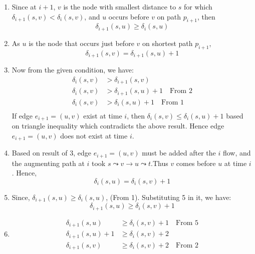 \documentclass[11pt]{article}
\begin{document}
\begin{enumerate}
    \item Since at $i+1$, $v$ is the node with smallest distance to $s$ for which $\delta_{i+1}(s,v) < \delta_{i}(s,v)$, and $u$ occurs before $v$ on path $p_{i+1}$, then
    $$\delta_{i+1}(s,u) \geq \delta_i(s,u)$$
    
    \item As $u$ is the node that occurs just before $v$ on shortest path $p_{i+1}$,
    $$\delta_{i+1}(s,v) = \delta_{i+1}(s,u) + 1$$
    
    \item Now from the given condition, we have:
        \begin{equation}\label{Q3_1}
            \begin{split}
                \delta_{i}(s,v) &> \delta_{i+1}(s,v)\\
                \delta_{i}(s,v) &> \delta_{i+1}(s,u)+1 \quad \text{From 2}\\
                \delta_{i}(s,v) &> \delta_{i}(s,u)+1 \quad \text{From 1}\\
            \end{split}
        \end{equation}
        If edge $e_{i+1}=(u, v)$ exist at time $i$, then $\delta_{i}(s,v) \leq \delta_{i}(s,u)+1$ based on triangle inequality which contradicts the above result. Hence edge $e_{i+1}=(u, v)$ does not exist at time $i$. 
        
    \item Based on result of $3$, edge $e_{i+1}=(u, v)$ must be added after the $i$ flow, and the augmenting path at $i$ took $s\leadsto v \rightarrow u \leadsto t$.Thus $v$ comes before $u$ at time $i$. Hence,
        $$\delta_{i}(s,u) = \delta_{i}(s,v)+1$$
        
    \item Since, $\delta_{i+1}(s,u) \geq \delta_i(s,u)$, (From 1). Substituting 5 in it, we have:
    $$\delta_{i+1}(s,u) \geq \delta_{i}(s,v)+1$$
    
    \item 
        \begin{equation}\label{Q3_2}
            \begin{split}
                \delta_{i+1}(s,u) &\geq \delta_{i}(s,v)+1 \quad \text{From 5}\\
                \delta_{i+1}(s,u)+1 &\geq \delta_{i}(s,v)+2\\
                \delta_{i+1}(s,v) &\geq \delta_{i}(s,v)+2 \quad \text{From 2}
            \end{split}
        \end{equation}
    

\end{enumerate}
\end{document}

